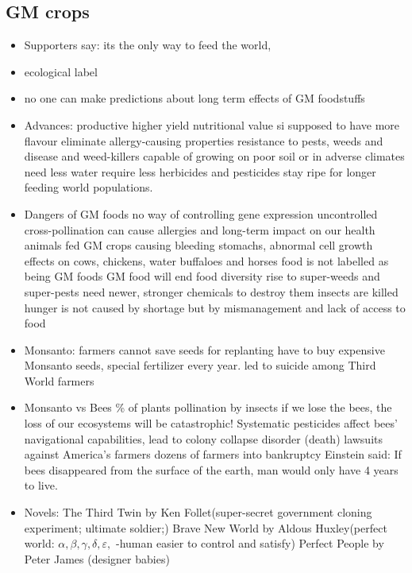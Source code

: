 \documentclass[a5paper,12pt,twoside,titlepage]{scrartcl}
\begin{document}
		\subsection{GM crops}
		\begin{itemize}
			\item Supporters say: its the only way to feed the world, 
			\item ecological label
			\item no one can make predictions about long term effects of GM foodstuffs
			\item Advances:
			\subitem productive \textrightarrow higher yield nutritional value
			\subitem si supposed to have more flavour
			\subitem eliminate allergy-causing properties
			\subitem resistance to pests, weeds and disease and weed-killers
			\subitem capable of growing on poor soil or in adverse climates
			\subitem need less water
			\subitem require less herbicides and pesticides
			\subitem stay ripe for longer
			\subitem feeding world populations.
			\item Dangers of GM foods
			\subitem no way of controlling gene expression
			\subitem uncontrolled cross-pollination 
			\subitem can cause allergies and long-term impact on our health
			\subitem animals fed GM crops \textrightarrow causing bleeding stomachs, abnormal cell growth
			\subitem effects on cows, chickens, water buffaloes and horses
			\subitem food is not labelled as being GM foods
			\subitem GM food will end food diversity 
			\subitem rise to super-weeds and super-pests \textrightarrow need newer, stronger chemicals to destroy them
			\subitem insects are killed
			\subitem hunger is not caused by shortage but by mismanagement and lack of access to food
			\item Monsanto:
			\subitem farmers cannot save seeds for replanting
			\subitem \textrightarrow have to buy expensive Monsanto seeds, special fertilizer every year.
			\subitem \textrightarrow led to suicide among Third World farmers
			\item Monsanto vs Bees
			\% of plants pollination by insects
			\subitem if we lose the bees, the loss of our ecosystems will be catastrophic!
			\subitem Systematic pesticides affect bees' navigational capabilities, lead to colony collapse disorder (\textrightarrow death)
			 lawsuits against America's farmers \textrightarrow dozens of farmers into bankruptcy
			\subitem Einstein said: If bees disappeared from the surface of the earth, man would only have 4 years to live.
			\item Novels:
			\subitem The Third Twin by Ken Follet(super-secret government cloning experiment; ultimate soldier;)
			\subitem Brave New World by Aldous Huxley(perfect world: $\alpha, \beta, \gamma, \delta, \varepsilon,$ -human \textrightarrow easier to control and satisfy)
			\subitem Perfect People by Peter James (designer babies)
			\end{itemize}
\end{document}
